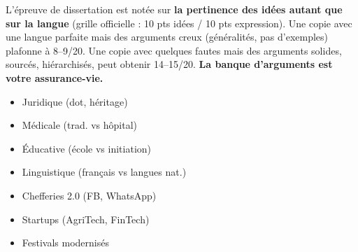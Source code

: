 \documentclass[11pt]{article}
\begin{document}
\begin{savaistu}
L'épreuve de dissertation est notée sur \textbf{la pertinence des idées autant que sur la langue} (grille officielle : 10 pts idées / 10 pts expression). Une copie avec une langue parfaite mais des arguments creux (généralités, pas d'exemples) plafonne à 8–9/20. Une copie avec quelques fautes mais des arguments solides, sourcés, hiérarchisés, peut obtenir 14–15/20. \textbf{La banque d'arguments est votre assurance-vie.}
\end{savaistu}

\begin{popfigure}
\begin{center}\end{center}
\vspace{-2pt}
\begin{tcbraster}[raster columns=2,raster equal height=rows,raster column skip=6pt,raster row skip=6pt,enhanced,blankest]
\begin{tcolorbox}[enhanced,colback=white,colframe=poporange,boxrule=0.9pt,arc=3pt,title={Conflits \& Tensions},fonttitle=\bfseries\scriptsize,coltitle=white,colbacktitle=poporange,left=4pt,right=4pt,top=2pt,bottom=2pt,boxsep=1pt,toptitle=1.5pt,bottomtitle=1.5pt,halign=left]
\begin{itemize}[nosep,leftmargin=*,itemsep=1pt,font=\scriptsize]
\item Juridique (dot, héritage)
\item Médicale (trad. vs hôpital)
\item Éducative (école vs initiation)
\item Linguistique (français vs langues nat.)
\end{itemize}
\end{tcolorbox}
\begin{tcolorbox}[enhanced,colback=white,colframe=popgreen,boxrule=0.9pt,arc=3pt,title={Hybridations \& Innovations},fonttitle=\bfseries\scriptsize,coltitle=white,colbacktitle=popgreen,left=4pt,right=4pt,top=2pt,bottom=2pt,boxsep=1pt,toptitle=1.5pt,bottomtitle=1.5pt,halign=left]
\begin{itemize}[nosep,leftmargin=*,itemsep=1pt,font=\scriptsize]
\item Chefferies 2.0 (FB, WhatsApp)
\item Startups (AgriTech, FinTech)
\item Festivals modernisés

\end{itemize}
\end{tcolorbox}
\end{tcbraster}
\end{popfigure}
\end{document}
